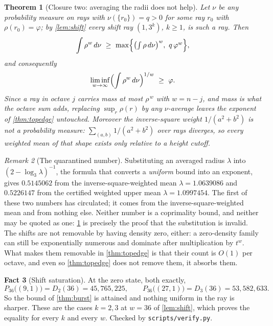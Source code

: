 \documentclass[11pt]{amsart}
\newtheorem{theorem}{Theorem}[section]
\theoremstyle{definition}
\newtheorem{fact}[theorem]{Fact}
\theoremstyle{remark}
\newtheorem{remark}[theorem]{Remark}
\begin{document}
\begin{theorem}[Closure two: averaging the radii does not help]
\label{thm:closure-two}
Let $\nu$ be any probability measure on rays with $\nu(\{r_0\}) = q > 0$ for some ray $r_0$ with $\rho(r_0) = \varphi$; by \cref{lem:shift} every shift ray $(1,3^k)$, $k \ge 1$, is such a ray. Then
\[
  \int \rho^w \, d\nu \ \ge \ \max\Bigl\{ \bigl(\textstyle\int \rho \, d\nu\bigr)^w, \ q\,\varphi^w \Bigr\} ,
\]
and consequently
\[
  \liminf_{w \to \infty} \Bigl( \int \rho^w \, d\nu \Bigr)^{1/w} \ \ge \ \varphi .
\]
Since a ray in octave $j$ carries mass at most $\rho^{\,w}$ with $w = n - j$, and mass is what the octave sum adds, replacing $\sup_r \rho(r)$ by any $\nu$-average leaves the exponent of \cref{thm:topedge} untouched. Moreover the inverse-square weight $1/(a^2+b^2)$ is not a probability measure: $\sum_{(a,b)} 1/(a^2+b^2)$ over rays diverges, so every weighted mean of that shape exists only relative to a height cutoff.
\end{theorem}

\begin{remark}[The quarantined number]
\label{rem:quarantine}
Substituting an averaged radius $\lambda$ into $(2 - \log_3\lambda)^{-1}$, the formula that converts a \emph{uniform} bound into an exponent, gives $0.5145062$ from the inverse-square-weighted mean $\lambda = 1.0639086$ and $0.5226147$ from the certified weighted upper mean $\lambda = 1.0997454$. The first of these two numbers has circulated; it comes from the inverse-square-weighted mean and from nothing else. Neither number is a coprimality bound, and neither may be quoted as one: \cref{thm:closure-two} is precisely the proof that the substitution is invalid. The shifts are not removable by having density zero, either: a zero-density family can still be exponentially numerous and dominate after multiplication by $t^w$. What makes them removable in \cref{thm:topedge} is that their count is $O(1)$ per octave, and even so \cref{thm:topedge} does not remove them, it absorbs them.
\end{remark}

\begin{fact}[Shift saturation]
\label{fact:saturation}
At the zero state, both exactly,
\[
  P_{36}\bigl((9,1)\bigr) = D_2(36) = 45{,}765{,}225, \qquad P_{36}\bigl((27,1)\bigr) = D_3(36) = 53{,}582{,}633 .
\]
So the bound of \cref{thm:burst} is attained and nothing uniform in the ray is sharper. These are the cases $k = 2, 3$ at $w = 36$ of \cref{lem:shift}, which proves the equality for every $k$ and every $w$. Checked by \texttt{scripts/verify.py}.
\end{fact}
\end{document}
